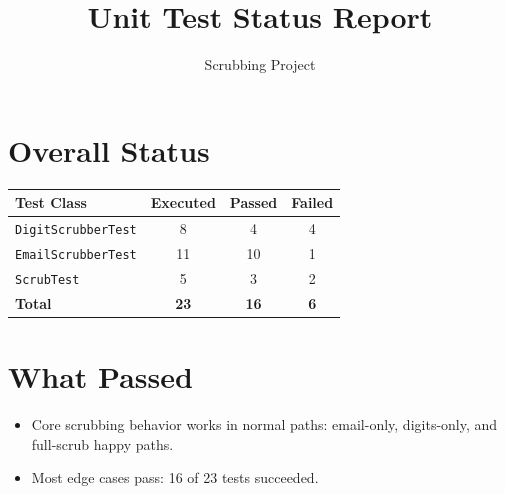 \documentclass[11pt]{article}
\title{Unit Test Status Report}
\author{Scrubbing Project}
\begin{document}
\maketitle

\section*{Overall Status}
\begin{center}
\begin{tabular}{|l|c|c|c|}
\hline
\textbf{Test Class} & \textbf{Executed} & \textbf{Passed} & \textbf{Failed} \\
\hline
\texttt{DigitScrubberTest} & 8 & 4 & 4 \\
\hline
\texttt{EmailScrubberTest} & 11 & 10 & 1 \\
\hline
\texttt{ScrubTest} & 5 & 3 & 2 \\
\hline
\textbf{Total} & \textbf{23} & \textbf{16} & \textbf{6} \\
\hline
\end{tabular}
\end{center}

\section*{What Passed}
\begin{itemize}
  \item Core scrubbing behavior works in normal paths: email-only, digits-only, and full-scrub happy paths.
  \item Most edge cases pass: 16 of 23 tests succeeded.
\end{itemize}
\end{document}
